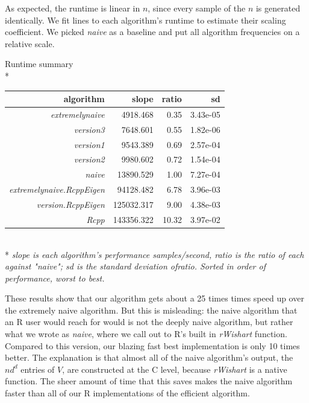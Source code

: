 \documentclass[english]{report}
\begin{document}
As expected, the runtime is linear in $n$, since every sample of the $n$ is generated identically. We fit lines to each algorithm's runtime to estimate their scaling coefficient. We picked \emph{naive} as a baseline and put all algorithm frequencies on a relative scale.



\begin{center}
Runtime summary\\*
\begin{tabular}{rrrr}
    algorithm       & slope  &      ratio   &        sd\\
    \hline
              \emph{extremelynaive}   &4918.468  & 0.35 & 3.43e-05 \\
                \emph{version3}   &7648.601 & 0.55 & 1.82e-06 \\
               \emph{version1}   &9543.389 & 0.69 &2.57e-04 \\
                \emph{version2}   & 9980.602 & 0.72 & 1.54e-04 \\
                   \emph{naive}  &13890.529  & 1.00 & 7.27e-04 \\
  \emph{extremelynaive.RcppEigen} & 94128.482 & 6.78 & 3.96e-03 \\
        \emph{version.RcppEigen} & 125032.317  & 9.00 & 4.38e-03 \\
                     \emph{Rcpp} & 143356.322  & 10.32 & 3.97e-02 \\
    \hline
\end{tabular} \\*
 \emph{
    \emph{slope} is each algorithm's performance samples/second,
    \emph{ratio} is the ratio of each against "naive";
    \emph{sd} is the standard deviation of\emph{ratio}. Sorted in order of performance, worst to best.
    }
\end{center}

These results show that our algorithm gets about a 25 times times speed up over the extremely naive algorithm. But this is misleading: the naive algorithm that an R user would reach for would is not the deeply naive algorithm, but rather what we wrote as \emph{naive}, where we call out to R's built in \emph{rWishart} function. Compared to this version, our blazing fast best implementation is only 10 times better. The explanation is that almost all of the naive algorithm's output, the $n d^d$ entries of $V$, are constructed at the C level, because \emph{rWishart} is a native function. The sheer amount of time that this saves makes the naive algorithm faster than all of our R implementations of the efficient algorithm.
\end{document}

